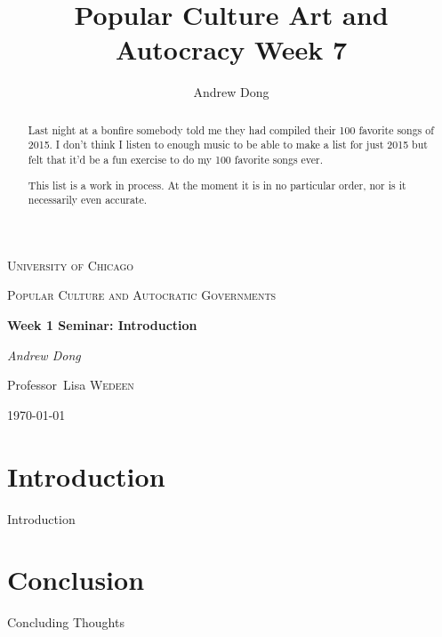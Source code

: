 \documentclass{article}
\begin{document}
\begin{titlepage}
	\centering
	{\scshape\LARGE University of Chicago \par}
	\vspace{1cm}
	{\scshape\Large Popular Culture and Autocratic Governments\par}
	\vspace{1.5cm}
	{\huge\bfseries Week 1 Seminar: Introduction \par}
	\vspace{1cm}
	{\Large\itshape Andrew Dong\par}
	\vspace{2cm}
	
	\vfill


\begin{abstract}
Last night at a bonfire somebody told me they had compiled their 100 favorite songs of 2015.  I don't think I listen to enough music to be able to make a list for just 2015 but felt that it'd be a fun exercise to do my 100 favorite songs ever.  

This list is a work in process.  At the moment it is in no particular order, nor is it necessarily even accurate.  


\end{abstract}

\vfill

	Professor~Lisa \textsc{Wedeen}
	\vspace{5 mm}
	\\{\large \today\par}
\end{titlepage}

\title{Popular Culture Art and Autocracy Week 7}
\author{Andrew Dong}

\maketitle


\section{Introduction}

Introduction




\section{Conclusion}

Concluding Thoughts
\end{document}
